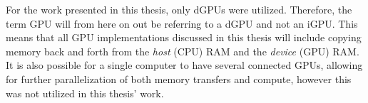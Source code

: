 For the work presented in this thesis, only dGPUs were utilized. 
Therefore, the term GPU will from here on out be referring to a dGPU and not an iGPU.
This means that all GPU implementations discussed in this thesis will include copying memory back and forth from the \textit{host} (CPU) RAM and the \textit{device} (GPU) RAM.
It is also possible for a single computer to have several connected GPUs, allowing for further parallelization of both memory transfers and compute, however this was not utilized in this thesis' work.

